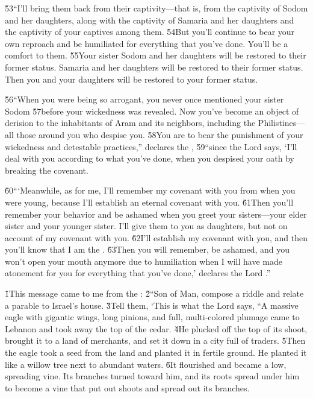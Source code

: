 \v{53}``I'll bring them back from their captivity---that is, from the captivity of Sodom and her daughters, along with the captivity of Samaria and her daughters and the captivity of your captives among them. \v{54}But you'll continue to bear your own reproach and be humiliated for everything that you've done. You'll be a comfort to them. \v{55}Your sister Sodom and her daughters will be restored to their former status. Samaria and her daughters will be restored to their former status. Then you and your daughters will be restored to your former status.

\v{56}``When you were being so arrogant, you never once mentioned your sister Sodom \v{57}before your wickedness was revealed. Now you've become an object of derision to the inhabitants of Aram and its neighbors, including the Philistines---all those around you who despise you. \v{58}You are to bear the punishment of your wickedness and detestable practices,'' declares the , \v{59}``since the Lord  says, `I'll deal with you according to what you've done, when you despised your oath by breaking the covenant.

\v{60}```Meanwhile, as for me, I'll remember my covenant with you from when you were young, because I'll establish an eternal covenant with you. \v{61}Then you'll remember your behavior and be ashamed when you greet your sisters---your elder sister and your younger sister. I'll give them to you as daughters, but not on account of my covenant with you. \v{62}I'll establish my covenant with you, and then you'll know that I am the . \v{63}Then you will remember, be ashamed, and you won't open your mouth anymore due to humiliation when I will have made atonement for you for everything that you've done,' declares the Lord .''

\v{1}This message came to me from the : \v{2}``Son of Man, compose a riddle and relate a parable to Israel's house. \v{3}Tell them, `This is what the Lord  says, ``A massive eagle with gigantic wings, long pinions, and full, multi-colored plumage came to Lebanon and took away the top of the cedar. \v{4}He plucked off the top of its shoot, brought it to a land of merchants, and set it down in a city full of traders. \v{5}Then the eagle took a seed from the land and planted it in fertile ground. He planted it like a willow tree next to abundant waters. \v{6}It flourished and became a low, spreading vine. Its branches turned toward him, and its roots spread under him to become a vine that put out shoots and spread out its branches.

